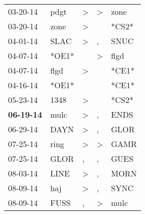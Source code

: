\begin{supertabular}{p{0.07\textwidth}p{0.06\textwidth}p{0.02\textwidth}p{0.02\textwidth}p{0.06\textwidth}}
          03-20-14\textsuperscript{} &           pdgt\textsuperscript{} &     \textgreater &     \textgreater &           zone\textsuperscript{} \\
          03-20-14\textsuperscript{} &           zone\textsuperscript{} &     \textgreater &                  &                            *CS2* \\
          04-01-14\textsuperscript{} &           SLAC\textsuperscript{} &     \textgreater &                , &           SNUC\textsuperscript{} \\
          04-07-14\textsuperscript{} &                            *OE1* &                  &     \textgreater &           flgd\textsuperscript{} \\
          04-07-14\textsuperscript{} &           flgd\textsuperscript{} &     \textgreater &                  &                            *CE1* \\
          04-16-14\textsuperscript{} &                            *OE1* &                  &                  &                            *CE1* \\
          05-23-14\textsuperscript{} &           1348\textsuperscript{} &     \textgreater &                  &                            *CS2* \\
 \textbf{06-19-14\textsuperscript{}} &           mulc\textsuperscript{} &     \textgreater &                , &           ENDS\textsuperscript{} \\
          06-29-14\textsuperscript{} &           DAYN\textsuperscript{} &     \textgreater &                , &           GLOR\textsuperscript{} \\
          07-25-14\textsuperscript{} &           ring\textsuperscript{} &     \textgreater &     \textgreater &           GAMR\textsuperscript{} \\
          07-25-14\textsuperscript{} &           GLOR\textsuperscript{} &                , &                , &           GUES\textsuperscript{} \\
          08-03-14\textsuperscript{} &           LINE\textsuperscript{} &     \textgreater &                , &           MORN\textsuperscript{} \\
          08-09-14\textsuperscript{} &            haj\textsuperscript{} &     \textgreater &                , &           SYNC\textsuperscript{} \\
          08-09-14\textsuperscript{} &           FUSS\textsuperscript{} &                , &     \textgreater &           mulc\textsuperscript{} \\

\end{supertabular}
